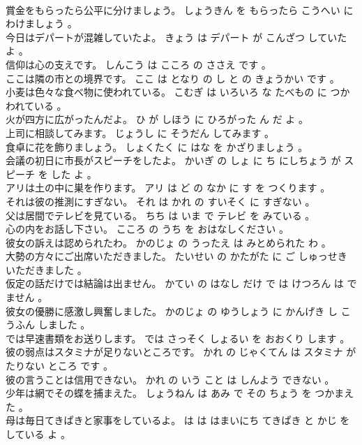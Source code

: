 \documentclass[8pt]{extreport}
\begin{document}
\begin{CJK}{UTF8}{min}
\\	賞金をもらったら公平に分けましょう。	しょうきん を もらったら こうへい に わけましょう 。 
\\	今日はデパートが混雑していたよ。	きょう は デパート が こんざつ していた よ 。 
\\	信仰は心の支えです。	しんこう は こころ の ささえ です 。 
\\	ここは隣の市との境界です。	ここ は となり の し と の きょうかい です 。 
\\	小麦は色々な食べ物に使われている。	こむぎ は いろいろ な たべもの に つかわれている 。 
\\	火が四方に広がったんだよ。	ひ が しほう に ひろがった ん だ よ 。 
\\	上司に相談してみます。	じょうし に そうだん してみます 。 
\\	食卓に花を飾りましょう。	しょくたく に はな を かざりましょう 。 
\\	会議の初日に市長がスピーチをしたよ。	かいぎ の しょ に ち にしちょう が スピーチ を した よ 。 
\\	アリは土の中に巣を作ります。	アリ は ど の なか に す を つくります 。 
\\	それは彼の推測にすぎない。	それ は かれ の すいそく に すぎない 。 
\\	父は居間でテレビを見ている。	ちち は いま で テレビ を みている 。 
\\	心の内をお話し下さい。	こころ の うち を おはなしください 。 
\\	彼女の訴えは認められたわ。	かのじょ の うったえ は みとめられた わ 。 
\\	大勢の方々にご出席いただきました。	たいせい の かたがた に ご しゅっせき いただきました 。 
\\	仮定の話だけでは結論は出ません。	かてい の はなし だけ で は けつろん は でません 。 
\\	彼女の優勝に感激し興奮しました。	かのじょ の ゆうしょう に かんげき し こうふん しました 。 
\\	では早速書類をお送りします。	では さっそく しょるい を おおくり します 。 
\\	彼の弱点はスタミナが足りないところです。	かれ の じゃくてん は スタミナ が たりない ところ です 。 
\\	彼の言うことは信用できない。	かれ の いう こと は しんよう できない 。 
\\	少年は網でその蝶を捕まえた。	しょうねん は あみ で その ちょう を つかまえた 。 
\\	母は毎日てきぱきと家事をしているよ。	は は はまいにち てきぱき と かじ を している よ 。 

\end{CJK}
\end{document}
